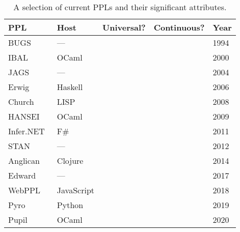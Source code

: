 \documentclass[sigconf]{acmart}
\newcommand{\cmark}{\textcolor{green1}{\checkmark}}%
\newcommand{\xmark}{\textcolor{red1}{\ding{55}}}%
\newcommand{\pupil}{Pupil\xspace}
\begin{document}
\begin{table}
  \centering
  \begin{tabular}{ l l c c l }
    \toprule
    \textbf{PPL}
    & \textbf{Host}
    & \textbf{Universal?}
    & \textbf{Continuous?}
    & \textbf{Year} \\
    \midrule

    BUGS~\cite{gilks1994bugs}
    & --- & \xmark & \cmark & 1994 \\

    IBAL~\cite{ibal}
    & OCaml & \xmark & \xmark & 2000 \\

    JAGS~\cite{plummer2004jags}
    & --- & \xmark & \cmark & 2004 \\

    Erwig~\cite{erwig}
    & Haskell & \cmark & \cmark & 2006\\

    Church~\cite{goodman2012church}
    & LISP & \cmark & \cmark & 2008 \\

    HANSEI~\cite{kiselyov2009embedded}
    & OCaml & \xmark & \xmark & 2009 \\

    Infer.NET~\cite{wang2011using}
    & F\# & \xmark & \cmark & 2011 \\

    STAN~\cite{carpenter2017stan}
    & --- & \xmark & \cmark & 2012 \\

    Anglican~\cite{anglican-smc}
    & Clojure & \cmark & \cmark & 2014 \\

    Edward~\cite{edward}
    & --- & \xmark & \cmark & 2017\\

    WebPPL~\cite{mobus2018structure}
    & JavaScript & \cmark & \cmark & 2018 \\

    Pyro~\cite{bingham2019pyro}
    & Python & \cmark & \cmark & 2019 \\

    \pupil
    & OCaml & \cmark & \cmark & 2020 \\
    \bottomrule
  \end{tabular}
  \caption{\label{tab:ppl-summ}
    A selection of current PPLs and their significant attributes.}
\end{table}
\end{document}
